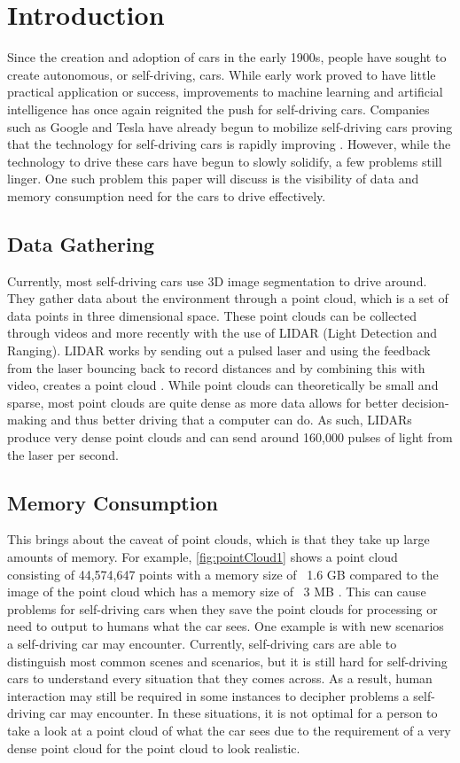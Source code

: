 \chapter{Introduction}
\indent Since the creation and adoption of cars in the early 1900s, people have sought to create autonomous, or self-driving, cars. While early work proved to have little practical application or success, improvements to machine learning and artificial intelligence has once again reignited the push for self-driving cars. Companies such as Google and Tesla have already begun to mobilize self-driving cars proving that the technology for self-driving cars is rapidly improving \cite{dormehl_edelstein_2018}. However, while the technology to drive these cars have begun to slowly solidify, a few problems still linger. One such problem this paper will discuss is the visibility of data and memory consumption need for the cars to drive effectively.

\section{Data Gathering}

\indent Currently, most self-driving cars use 3D image segmentation to drive around. They gather data about the environment through a point cloud, which is a set of data points in three dimensional space. These point clouds can be collected through videos and more recently with the use of LIDAR (Light Detection and Ranging). LIDAR works by sending out a pulsed laser and using the feedback from the laser bouncing back to record distances and by combining this with video, creates a point cloud \cite{gisgeography_2018}. While point clouds can theoretically be small and sparse, most point clouds are quite dense as more data allows for better decision-making and thus better driving that a computer can do. As such, LIDARs produce very dense point clouds and can send around 160,000 pulses of light from the laser per second.

\section{Memory Consumption}

\indent This brings about the caveat of point clouds, which is that they take up large amounts of memory. For example, \ref{fig:pointCloud1} shows a point cloud consisting of 44,574,647 points with a memory size of ~1.6 GB compared to the image of the point cloud which has a memory size of ~3 MB \cite{schauer_2017}. This can cause problems for self-driving cars when they save the point clouds for processing or need to output to humans what the car sees. One example is with new scenarios a self-driving car may encounter. Currently, self-driving cars are able to distinguish most common scenes and scenarios, but it is still hard for self-driving cars to understand every situation that they comes across. As a result, human interaction may still be required in some instances to decipher problems a self-driving car may encounter. In these situations, it is not optimal for a person to take a look at a point cloud of what the car sees due to the requirement of a very dense point cloud for the point cloud to look realistic. 

